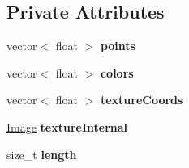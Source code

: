 \subsection*{Private Attributes}
\begin{DoxyCompactItemize}
\item 
\hypertarget{classMesh__t_a9476422d8945982cdeda2d4fb3cc3d56}{vector$<$ float $>$ {\bfseries points}}\label{classMesh__t_a9476422d8945982cdeda2d4fb3cc3d56}

\item 
\hypertarget{classMesh__t_a33e7fbdab42657f9eb4b1110ec025e8f}{vector$<$ float $>$ {\bfseries colors}}\label{classMesh__t_a33e7fbdab42657f9eb4b1110ec025e8f}

\item 
\hypertarget{classMesh__t_a3c9c4574d3dce437c6d02df11a23b639}{vector$<$ float $>$ {\bfseries texture\+Coords}}\label{classMesh__t_a3c9c4574d3dce437c6d02df11a23b639}

\item 
\hypertarget{classMesh__t_a805eebb1202da953bc0c798d0872864e}{\hyperlink{classImage}{Image} {\bfseries texture\+Internal}}\label{classMesh__t_a805eebb1202da953bc0c798d0872864e}

\item 
\hypertarget{classMesh__t_aedeeabba98db4ec126b3f1fcdd0fca1c}{size\+\_\+t {\bfseries length}}\label{classMesh__t_aedeeabba98db4ec126b3f1fcdd0fca1c}

\end{DoxyCompactItemize}
